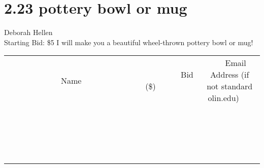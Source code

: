 \documentclass[11pt]{article}
\begin{document}
\section*{2.23 pottery bowl or mug}
Deborah Hellen
\\
Starting Bid: \$5
\newline
I will make you  a beautiful wheel-thrown pottery bowl or mug!
\\[3ex]
\begin{tabular}{c c c}
~~~~~~~~~~~~~Name~~~~~~~~~~~~~ & ~~~~~~~~~Bid (\$)~~~~~~~~~  & ~~~Email Address (if not standard olin.edu)~~~\\
 & & \\
\hline
 & & \\
\hline
 & & \\
\hline
 & & \\
\hline
 & & \\
\hline
 & & \\
\hline
 & & \\
\hline
 & & \\
\hline
 & & \\
\hline
 & & \\
\hline
 & & \\
\hline
 & & \\
\hline
 & & \\
\hline
 & & \\
\hline
 & & \\
\hline
 & & \\
\hline
 & & \\
\hline
 & & \\
\hline
 & & \\
\hline
\end{tabular}
\newpage
\end{document}
